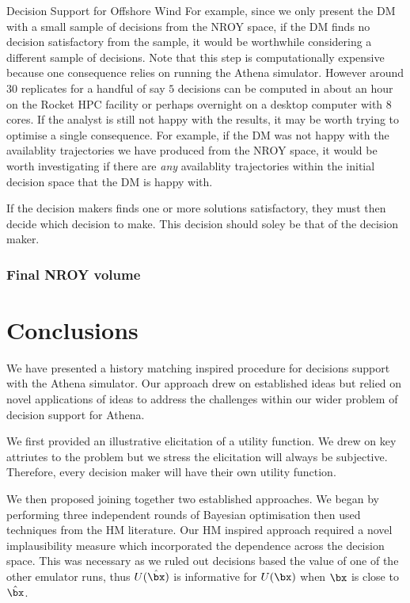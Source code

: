 \begin{chapter}{Decision Support for Offshore Wind \label{Ch:ds-for-ow}}
For example, since we only present the DM with a small sample of decisions from the NROY space, if the DM finds no decision satisfactory from the sample, it would be worthwhile considering a different sample of decisions. Note that this step is computationally expensive because one consequence relies on running the Athena simulator. However around $30$ replicates for a handful of say $5$ decisions can be computed in about an hour on the Rocket HPC facility or perhaps overnight on a desktop computer with $8$ cores. If the analyst is still not happy with the results, it may be worth trying to optimise a single consequence. For example, if the DM was not happy with the availablity trajectories we have produced from the NROY space, it would be worth investigating if there are \textit{any} availablity trajectories within the initial decision space that the DM is happy with.

If the decision makers finds one or more solutions satisfactory, they must then decide which decision to make. This decision should soley be that of the decision maker.

\subsubsection{Final NROY volume}

\section{Conclusions}

We have presented a history matching inspired procedure for decisions support with the Athena simulator. Our approach drew on established ideas but relied on novel applications of ideas to address the challenges within our wider problem of decision support for Athena.

We first provided an illustrative elicitation of a utility function. We drew on key attriutes to the problem but we stress the elicitation will always be subjective. Therefore, every decision maker will have their own utility function.

We then proposed joining together two established approaches. We began by performing three independent rounds of Bayesian optimisation then used techniques from the HM literature. Our HM inspired approach required a novel implausibility measure  which incorporated the dependence across the decision space. This was necessary as we ruled out decisions based the value of one of the other emulator runs, thus $U(\hat{\bx})$ is informative for $U(\bx)$ when $\bx$ is close to $\hat{\bx}$.


\end{chapter}

